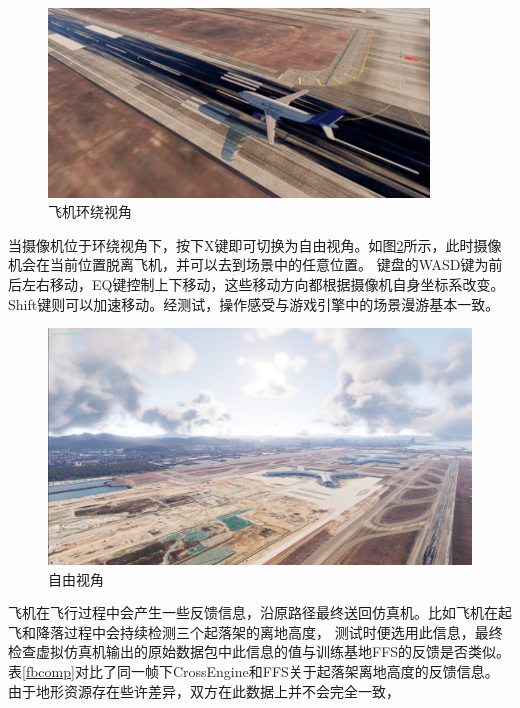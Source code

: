 \begin{figure}[h!]
    \begin{center}
        \includegraphics[width=0.9\textwidth]{pictures/orbitcamera.png}
        \caption{飞机环绕视角}
        \label{orbittest}
    \end{center}
\end{figure}
\par
当摄像机位于环绕视角下，按下X键即可切换为自由视角。如图\ref{freetest}所示，此时摄像机会在当前位置脱离飞机，并可以去到场景中的任意位置。
键盘的WASD键为前后左右移动，EQ键控制上下移动，这些移动方向都根据摄像机自身坐标系改变。Shift键则可以加速移动。经测试，操作感受与游戏引擎中的场景漫游基本一致。
\begin{figure}[h!]
    \begin{center}
        \includegraphics[width=.85\textwidth]{pictures/freecamera.png}
        \caption{自由视角}
        \label{freetest}
    \end{center}
\end{figure}
\par
飞机在飞行过程中会产生一些反馈信息，沿原路径最终送回仿真机。比如飞机在起飞和降落过程中会持续检测三个起落架的离地高度，
测试时便选用此信息，最终检查虚拟仿真机输出的原始数据包中此信息的值与训练基地FFS的反馈是否类似。
表\ref{fbcomp}对比了同一帧下CrossEngine和FFS关于起落架离地高度的反馈信息。由于地形资源存在些许差异，双方在此数据上并不会完全一致，
